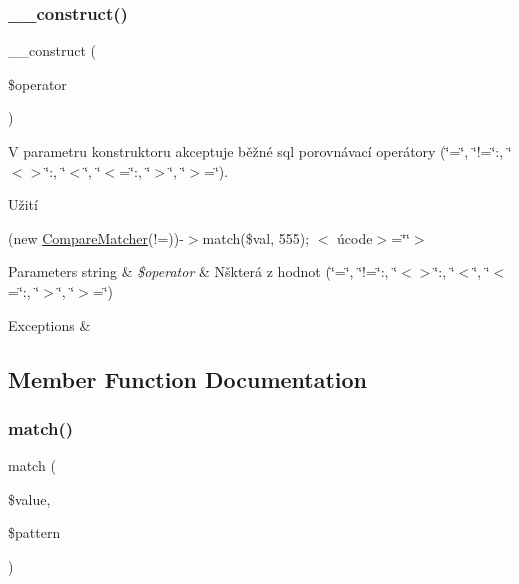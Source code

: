 \subsubsection{\texorpdfstring{\+\_\+\+\_\+construct()}{\_\_construct()}}
{\footnotesize\ttfamily \+\_\+\+\_\+construct (\begin{DoxyParamCaption}\item[{}]{\$operator }\end{DoxyParamCaption})}

V parametru konstruktoru akceptuje běžné sql porovnávací operátory (\char`\"{}=\char`\"{}, \char`\"{}!=\char`\"{}\+:, \char`\"{}$<$$>$\char`\"{}\+:, \char`\"{}$<$\char`\"{}, \char`\"{}$<$=\char`\"{}\+:, \char`\"{}$>$\char`\"{}, \char`\"{}$>$=\char`\"{}). 

Užití

{\ttfamily  (new \mbox{\hyperlink{class_pes_1_1_query_1_1_matcher_1_1_compare_matcher}{Compare\+Matcher}}(\textquotesingle{}!=\textquotesingle{}))-\/$>$match(\$val, 555); $<$ úcode$>$=\char`\"{}\char`\"{}$>$ 
\begin{DoxyParams}[1]{Parameters}
string & {\em \$operator} & Nškterá z hodnot (\char`\"{}=\char`\"{}, \char`\"{}!=\char`\"{}\+:, \char`\"{}$<$$>$\char`\"{}\+:, \char`\"{}$<$\char`\"{}, \char`\"{}$<$=\char`\"{}\+:, \char`\"{}$>$\char`\"{}, \char`\"{}$>$=\char`\"{}) \\
\hline
\end{DoxyParams}

\begin{DoxyExceptions}{Exceptions}
{\em } & \\
\hline
\end{DoxyExceptions}
}

\subsection{Member Function Documentation}
\mbox{\label{class_pes_1_1_query_1_1_matcher_1_1_compare_matcher_af38750109828e091458dbb0481a2a0d7}} 
\subsubsection{\texorpdfstring{match()}{match()}}
{\footnotesize\ttfamily match (\begin{DoxyParamCaption}\item[{}]{\$value,  }\item[{}]{\$pattern }\end{DoxyParamCaption})}


